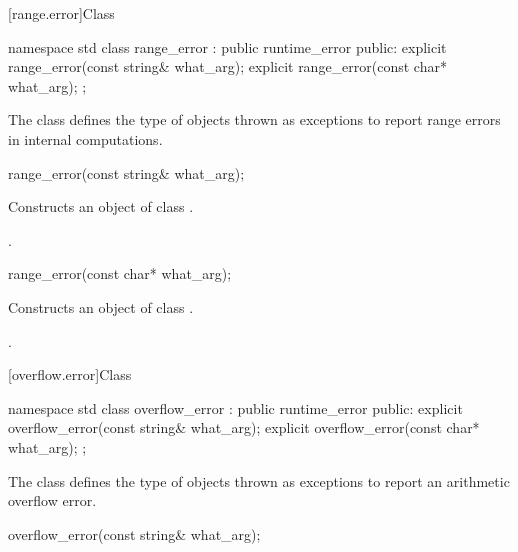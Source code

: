 [range.error]{Class }

%
\begin{codeblock}
namespace std {
  class range_error : public runtime_error {
  public:
    explicit range_error(const string& what_arg);
    explicit range_error(const char* what_arg);
  };
}
\end{codeblock}

\pnum
The class
defines the type of objects thrown as exceptions to report range errors
in internal computations.

%
\begin{itemdecl}
range_error(const string& what_arg);
\end{itemdecl}

\begin{itemdescr}
\pnum
\effects
Constructs an object of class
.

\pnum
\postcondition
{}.
\end{itemdescr}

%
\begin{itemdecl}
range_error(const char* what_arg);
\end{itemdecl}

\begin{itemdescr}
\pnum
\effects
Constructs an object of class
.

\pnum
\postcondition
{}.
\end{itemdescr}

[overflow.error]{Class }

%
\begin{codeblock}
namespace std {
  class overflow_error : public runtime_error {
  public:
    explicit overflow_error(const string& what_arg);
    explicit overflow_error(const char* what_arg);
  };
}
\end{codeblock}

\pnum
The class
defines the type of objects thrown as exceptions to report an arithmetic overflow error.

%
\begin{itemdecl}
overflow_error(const string& what_arg);
\end{itemdecl}

